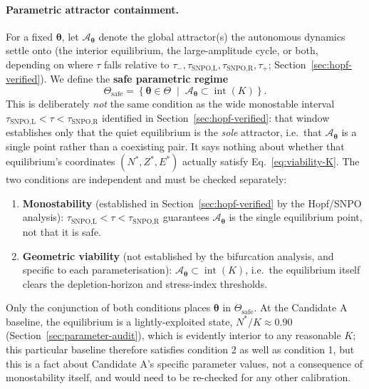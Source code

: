 \documentclass[twocolumn,10pt]{article}
\begin{document}
\paragraph{Parametric attractor containment.} For a fixed $\boldsymbol\theta$, let $\mathcal A_{\boldsymbol\theta}$ denote the global attractor(s) the autonomous dynamics settle onto (the interior equilibrium, the large-amplitude cycle, or both, depending on where $\tau$ falls relative to $\tau_-,\tau_{\text{SNPO,L}},\tau_{\text{SNPO,R}},\tau_+$; Section~\ref{sec:hopf-verified}). We define the \textbf{safe parametric regime}
\begin{equation}
\Theta_{\text{safe}} = \left\{ \boldsymbol\theta\in\Theta \;\middle|\; \mathcal A_{\boldsymbol\theta}\subset\operatorname{int}(K) \right\}.
\label{eq:viability-safe}
\end{equation}
This is deliberately \emph{not} the same condition as the wide monostable interval $\tau_{\text{SNPO,L}}<\tau<\tau_{\text{SNPO,R}}$ identified in Section~\ref{sec:hopf-verified}: that window establishes only that the quiet equilibrium is the \emph{sole} attractor, i.e.\ that $\mathcal A_{\boldsymbol\theta}$ is a single point rather than a coexisting pair. It says nothing about whether that equilibrium's coordinates $(N^*,Z^*,E^*)$ actually satisfy Eq.~\eqref{eq:viability-K}. The two conditions are independent and must be checked separately:
\begin{enumerate}
\item \textbf{Monostability} (established in Section~\ref{sec:hopf-verified} by the Hopf/SNPO analysis): $\tau_{\text{SNPO,L}}<\tau<\tau_{\text{SNPO,R}}$ guarantees $\mathcal A_{\boldsymbol\theta}$ is the single equilibrium point, not that it is safe.
\item \textbf{Geometric viability} (not established by the bifurcation analysis, and specific to each parameterisation): $\mathcal A_{\boldsymbol\theta}\subset\operatorname{int}(K)$, i.e.\ the equilibrium itself clears the depletion-horizon and stress-index thresholds.
\end{enumerate}
Only the conjunction of both conditions places $\boldsymbol\theta$ in $\Theta_{\text{safe}}$. At the Candidate A baseline, the equilibrium is a lightly-exploited state, $N^*/K\approx0.90$ (Section~\ref{sec:parameter-audit}), which is evidently interior to any reasonable $K$; this particular baseline therefore satisfies condition 2 as well as condition 1, but this is a fact about Candidate A's specific parameter values, not a consequence of monostability itself, and would need to be re-checked for any other calibration.
\end{document}
